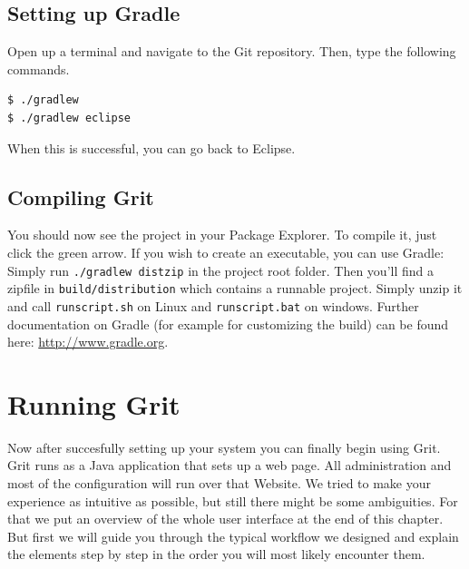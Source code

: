 \documentclass[10pt,a4paper, titlepage, toc=idx]{scrreprt}
\theoremstyle{definition}
\theoremstyle{plain}
\newcommand*{\product}{Grit}
\begin{document}
       \section{Setting up Gradle}

       Open up a terminal and navigate to the Git repository. Then,
       type the following commands.

       \begin{lstlisting}
$ ./gradlew
$ ./gradlew eclipse
\end{lstlisting}

       When this is successful, you can go back to Eclipse.

       \section{Compiling \product}

       You should now see the project in your Package Explorer. To
       compile it, just click the green arrow. If you wish to create
       an executable, you can use Gradle: Simply run \texttt{./gradlew
         distzip} in the project root folder. Then you'll find a
       zipfile in \texttt{build/distribution} which contains a
       runnable project. Simply unzip it and call
       \texttt{runscript.sh} on Linux and \texttt{runscript.bat} on
       windows. Further documentation on Gradle (for example for
       customizing the build) can be found here:
       \url{http://www.gradle.org}.
       
	\chapter{Running \product}
	Now after succesfully setting up your system you can finally
        begin using \product. \product{} runs as a Java application
        that sets up a web page. All administration and most of the
        configuration will run over that Website. We tried to make
        your experience as intuitive as possible, but still there
        might be some ambiguities. For that we put an overview of the
        whole user interface at the end of this chapter. But first we
        will guide you through the typical workflow we designed and
        explain the elements step by step in the order you will most
        likely encounter them.
\end{document}
